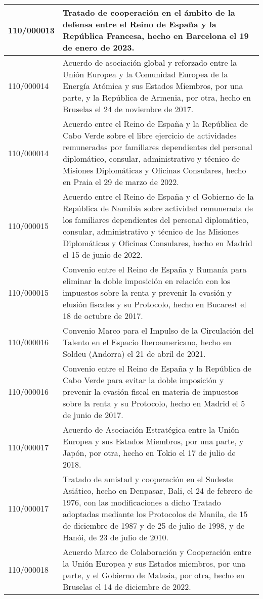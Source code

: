 {\begin{table}[H]
\begin{center}
\begin{tabularx}{\linewidth}{| l | X |}
\hline
110/000013 & Tratado de cooperación en el ámbito de la defensa entre el Reino de España y la República Francesa, hecho en Barcelona el 19 de enero de 2023. \\
\hline
110/000014 & Acuerdo de asociación global y reforzado entre la Unión Europea y la Comunidad Europea de la Energía Atómica y sus Estados Miembros, por una parte, y la República de Armenia, por otra, hecho en Bruselas el 24 de noviembre de 2017. \\
\hline
110/000014 & Acuerdo entre el Reino de España y la República de Cabo Verde sobre el libre ejercicio de actividades remuneradas por familiares dependientes del personal diplomático, consular, administrativo y técnico de Misiones Diplomáticas y Oficinas Consulares, hecho en Praia el 29 de marzo de 2022. \\
\hline
110/000015 & Acuerdo entre el Reino de España y el Gobierno de la República de Namibia sobre actividad remunerada de los familiares dependientes del personal diplomático, consular, administrativo y técnico de las Misiones Diplomáticas y Oficinas Consulares, hecho en Madrid el 15 de junio de 2022. \\
\hline
110/000015 & Convenio entre el Reino de España y Rumanía para eliminar la doble imposición en relación con los impuestos sobre la renta y prevenir la evasión y elusión fiscales y su Protocolo, hecho en Bucarest el 18 de octubre de 2017. \\
\hline
110/000016 & Convenio Marco para el Impulso de la Circulación del Talento en el Espacio Iberoamericano, hecho en Soldeu (Andorra) el 21 de abril de 2021. \\
\hline
110/000016 & Convenio entre el Reino de España y la República de Cabo Verde para evitar la doble imposición y prevenir la evasión fiscal en materia de impuestos sobre la renta y su Protocolo, hecho en Madrid el 5 de junio de 2017. \\
\hline
110/000017 & Acuerdo de Asociación Estratégica entre la Unión Europea y sus Estados Miembros, por una parte, y Japón, por otra, hecho en Tokio el 17 de julio de 2018. \\
\hline
110/000017 & Tratado de amistad y cooperación en el Sudeste Asiático, hecho en Denpasar, Bali, el 24 de febrero de 1976, con las modificaciones a dicho Tratado adoptadas mediante los Protocolos de Manila, de 15 de diciembre de 1987 y de 25 de julio de 1998, y de Hanói, de 23 de julio de 2010. \\
\hline
110/000018 & Acuerdo Marco de Colaboración y Cooperación entre la Unión Europea y sus Estados miembros, por una parte, y el Gobierno de Malasia, por otra, hecho en Bruselas el 14 de diciembre de 2022. \\

\end{tabularx}
\end{center}
\end{table}}
